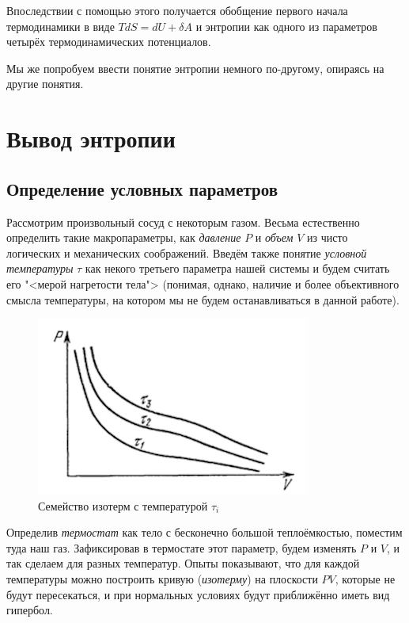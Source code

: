 \documentclass[12pt]{kiarticle}
\newcommand{\del}{\ensuremath{\delta}}
\begin{document}
Впоследствии с помощью этого получается обобщение первого начала термодинамики в виде $ TdS = dU + \del A $ и энтропии как одного из параметров четырёх термодинамических потенциалов. 

Мы же попробуем ввести понятие энтропии немного по-другому, опираясь на другие понятия.

\section{Вывод энтропии}

\subsection{Определение условных параметров} \label{ifTS}

Рассмотрим произвольный сосуд с некоторым газом. Весьма естественно определить такие макропараметры, как \textit{давление} $ P $ и \textit{объем} $ V $ из чисто логических и механических соображений. Введём также понятие \textit{условной температуры} $ \tau $ как некого третьего параметра нашей системы и будем считать его "<мерой нагретости тела"> (понимая, однако, наличие и более объективного смысла температуры, на котором мы не будем останавливаться в данной работе). 

\begin{figure} 
	\includegraphics{tempdef}
	\caption{Семейство изотерм с температурой $ \tau_i $}
\end{figure}

Определив \textit{термостат} как тело с бесконечно большой теплоёмкостью, поместим туда наш газ. Зафиксировав в термостате этот параметр, будем изменять $ P $ и $ V $, и так сделаем для разных температур. Опыты показывают, что для каждой температуры можно построить кривую (\textit{изотерму}) на плоскости $ PV $, которые не будут пересекаться, и при нормальных условиях будут приближённо иметь вид гипербол. 
\end{document}
